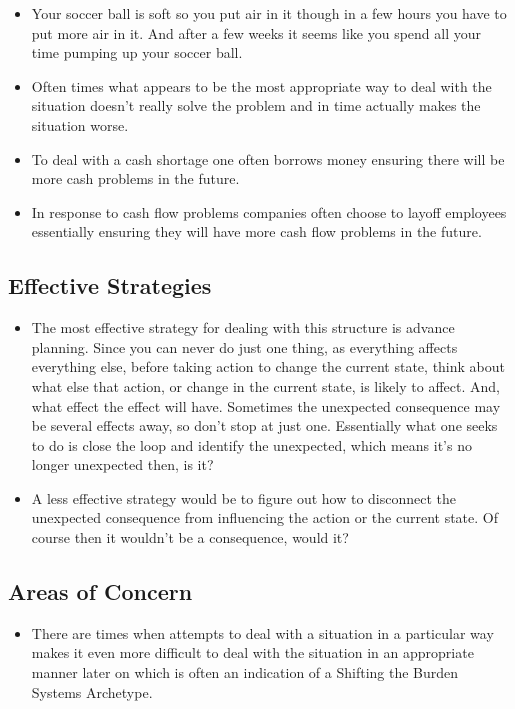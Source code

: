 \documentclass[]{memoir}
\begin{document}
\begin{itemize}
\itemsep1pt\parskip0pt
\item
  Your soccer ball is soft so you put air in it though in a few hours
  you have to put more air in it. And after a few weeks it seems like
  you spend all your time pumping up your soccer ball.
\item
  Often times what appears to be the most appropriate way to deal with
  the situation doesn't really solve the problem and in time actually
  makes the situation worse.
\item
  To deal with a cash shortage one often borrows money ensuring there
  will be more cash problems in the future.
\item
  In response to cash flow problems companies often choose to layoff
  employees essentially ensuring they will have more cash flow problems
  in the future.
\end{itemize}

\subsection{Effective Strategies}

\begin{itemize}
\itemsep1pt\parskip0pt
\item
  The most effective strategy for dealing with this structure is advance
  planning. Since you can never do just one thing, as everything affects
  everything else, before taking action to change the current state,
  think about what else that action, or change in the current state, is
  likely to affect. And, what effect the effect will have. Sometimes the
  unexpected consequence may be several effects away, so don't stop at
  just one. Essentially what one seeks to do is close the loop and
  identify the unexpected, which means it's no longer unexpected then,
  is it?
\item
  A less effective strategy would be to figure out how to disconnect the
  unexpected consequence from influencing the action or the current
  state. Of course then it wouldn't be a consequence, would it?
\end{itemize}

\subsection{Areas of Concern}

\begin{itemize}
\itemsep1pt\parskip0pt
\item
  There are times when attempts to deal with a situation in a particular
  way makes it even more difficult to deal with the situation in an
  appropriate manner later on which is often an indication of a Shifting
  the Burden Systems Archetype.
\end{itemize}
\end{document}
